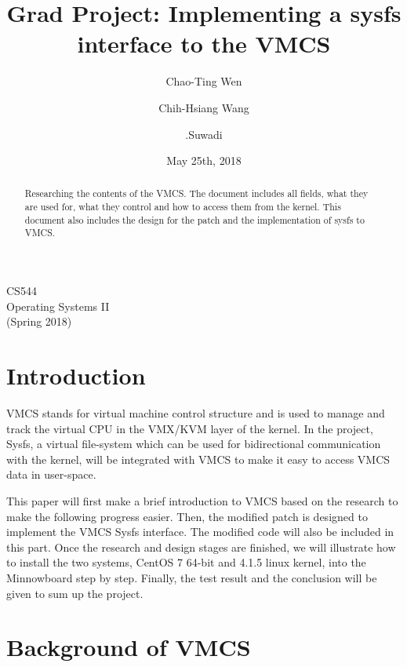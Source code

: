 \documentclass[10pt,draftclsnofoot,journal,compsoc,onecolumn]{IEEEtran}
\title{Grad Project: Implementing a sysfs interface to the VMCS}
\author{
  Chao-Ting Wen \hspace{.5cm}
  \and
  Chih-Hsiang Wang \hspace{.5cm}
  \and
  .Suwadi
}
\date{May 25th, 2018}
\begin{document}
\begin{titlepage} 
\maketitle
\begin{center}
CS544\\
Operating Systems II\\
(Spring 2018)
\vspace{50 mm}
\end{center}

\begin{abstract}
	Researching the contents of the VMCS. The document includes all fields, what they are used for, what they control and how to access them from the kernel. This document also includes the design for the patch and the implementation of sysfs to VMCS.
\end{abstract}
\end{titlepage}

\tableofcontents

\clearpage
\section{Introduction}
	\par VMCS stands for virtual machine control structure and is used to manage and track the virtual CPU in the VMX/KVM layer of the kernel. In the project, Sysfs, a virtual file-system which can be used for bidirectional communication with the kernel, will be integrated with VMCS to make it easy to access VMCS data in user-space. 
    \par This paper will first make a brief introduction to VMCS based on the research to make the following progress easier. Then, the modified patch is designed to implement the VMCS Sysfs interface. The modified code will also be included in this part. Once the research and design stages are finished, we will illustrate how to install the two systems, CentOS 7 64-bit and 4.1.5 linux kernel, into the Minnowboard step by step. Finally, the test result and the conclusion will be given to sum up the project. 
	
\section{Background of VMCS}
\end{document}
